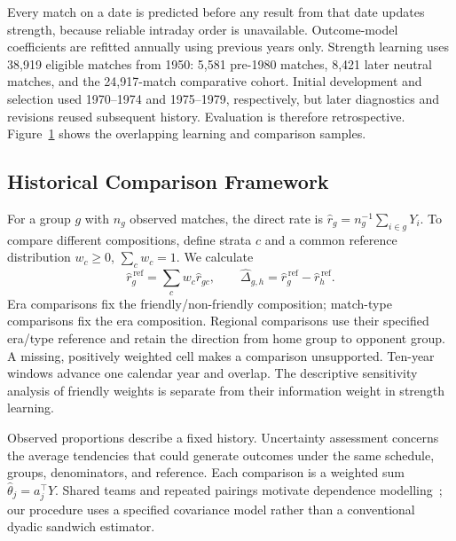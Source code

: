 Every match on a date is predicted before any result from that date updates strength, because reliable intraday order is unavailable. Outcome-model coefficients are refitted annually using previous years only. Strength learning uses 38,919 eligible matches from 1950: 5,581 pre-1980 matches, 8,421 later neutral matches, and the 24,917-match comparative cohort. Initial development and selection used 1970--1974 and 1975--1979, respectively, but later diagnostics and revisions reused subsequent history. Evaluation is therefore retrospective. Figure~\ref{fig:study-design} shows the overlapping learning and comparison samples.

\begin{figure}[htbp]
\centering

\label{fig:study-design}
\end{figure}

\subsection{Historical Comparison Framework}
\label{sec:comparison-method}

For a group $g$ with $n_g$ observed matches, the direct rate is $\widehat r_g=n_g^{-1}\sum_{i\in g}Y_i$. To compare different compositions, define strata $c$ and a common reference distribution $w_c\geq0$, $\sum_c w_c=1$. We calculate
\begin{equation}
 \widehat r_g^{\,\mathrm{ref}}=\sum_c w_c\widehat r_{gc},\qquad
 \widehat\Delta_{g,h}=\widehat r_g^{\,\mathrm{ref}}-\widehat r_h^{\,\mathrm{ref}}.
 \label{eq:standardization}
\end{equation}
Era comparisons fix the friendly/non-friendly composition; match-type comparisons fix the era composition. Regional comparisons use their specified era/type reference and retain the direction from home group to opponent group. A missing, positively weighted cell makes a comparison unsupported. Ten-year windows advance one calendar year and overlap. The descriptive sensitivity analysis of friendly weights is separate from their information weight in strength learning.

Observed proportions describe a fixed history. Uncertainty assessment concerns the average tendencies that could generate outcomes under the same schedule, groups, denominators, and reference. Each comparison is a weighted sum $\widehat\theta_j=a_j^\top Y$. Shared teams and repeated pairings motivate dependence modelling~\cite{aronow2015dyadic}; our procedure uses a specified covariance model rather than a conventional dyadic sandwich estimator.

